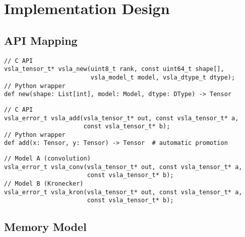 \documentclass[11pt]{article}
\begin{document}
\section{Implementation Design}
\label{sec:implementation}

\subsection{API Mapping}
\label{sec:api}

\begin{tcolorbox}[colback=api,colframe=green!50!black,title=C Library API Mapping]
\begin{description}[leftmargin=2em]
\item[Tensor Creation:] 
\begin{verbatim}
// C API
vsla_tensor_t* vsla_new(uint8_t rank, const uint64_t shape[], 
                        vsla_model_t model, vsla_dtype_t dtype);
// Python wrapper  
def new(shape: List[int], model: Model, dtype: DType) -> Tensor
\end{verbatim}

\item[Variable-Shape Operations:]
\begin{verbatim}
// C API  
vsla_error_t vsla_add(vsla_tensor_t* out, const vsla_tensor_t* a, 
                      const vsla_tensor_t* b);
// Python wrapper
def add(x: Tensor, y: Tensor) -> Tensor  # automatic promotion
\end{verbatim}

\item[Semiring Products:]
\begin{verbatim}
// Model A (convolution)
vsla_error_t vsla_conv(vsla_tensor_t* out, const vsla_tensor_t* a, 
                       const vsla_tensor_t* b);
// Model B (Kronecker)  
vsla_error_t vsla_kron(vsla_tensor_t* out, const vsla_tensor_t* a,
                       const vsla_tensor_t* b);
\end{verbatim}
\end{description}
\end{tcolorbox}

\subsection{Memory Model}
\label{sec:memory}
\end{document}
